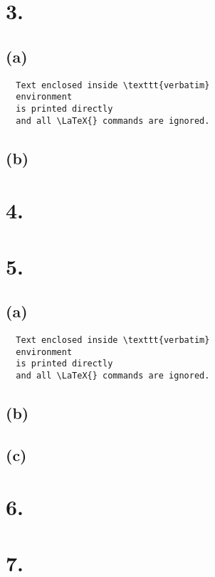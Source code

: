 \documentclass{article}
\begin{document}
\section*{3.}
{\Large 

\subsection*{(a)}

\begin{verbatim}
  Text enclosed inside \texttt{verbatim}
  environment 
  is printed directly 
  and all \LaTeX{} commands are ignored.
\end{verbatim}

\subsection*{(b)}


}

\section*{4.}
{\Large 



}

\section*{5.}
{\Large 

\subsection*{(a)}

\begin{verbatim}
  Text enclosed inside \texttt{verbatim}
  environment 
  is printed directly 
  and all \LaTeX{} commands are ignored.
\end{verbatim}

\subsection*{(b)}


\subsection*{(c)}

}

\section*{6.}
{\Large 



}

\section*{7.}
{\Large 



}
\end{document}
